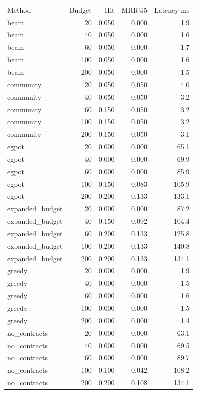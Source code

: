 \begin{tabular}{lrrrr}
Method & Budget & Hit & MRR@5 & Latency ms \\
beam & 20 & 0.050 & 0.000 & 1.9 \\
beam & 40 & 0.050 & 0.000 & 1.6 \\
beam & 60 & 0.050 & 0.000 & 1.7 \\
beam & 100 & 0.050 & 0.000 & 1.6 \\
beam & 200 & 0.050 & 0.000 & 1.5 \\
community & 20 & 0.050 & 0.050 & 4.0 \\
community & 40 & 0.050 & 0.050 & 3.2 \\
community & 60 & 0.150 & 0.050 & 3.2 \\
community & 100 & 0.150 & 0.050 & 3.2 \\
community & 200 & 0.150 & 0.050 & 3.1 \\
egpot & 20 & 0.000 & 0.000 & 65.1 \\
egpot & 40 & 0.000 & 0.000 & 69.9 \\
egpot & 60 & 0.000 & 0.000 & 85.9 \\
egpot & 100 & 0.150 & 0.083 & 105.9 \\
egpot & 200 & 0.200 & 0.133 & 133.1 \\
expanded\_budget & 20 & 0.000 & 0.000 & 87.2 \\
expanded\_budget & 40 & 0.150 & 0.092 & 104.4 \\
expanded\_budget & 60 & 0.200 & 0.133 & 125.8 \\
expanded\_budget & 100 & 0.200 & 0.133 & 140.8 \\
expanded\_budget & 200 & 0.200 & 0.133 & 134.1 \\
greedy & 20 & 0.000 & 0.000 & 1.9 \\
greedy & 40 & 0.000 & 0.000 & 1.5 \\
greedy & 60 & 0.000 & 0.000 & 1.6 \\
greedy & 100 & 0.000 & 0.000 & 1.5 \\
greedy & 200 & 0.000 & 0.000 & 1.4 \\
no\_contracts & 20 & 0.000 & 0.000 & 63.1 \\
no\_contracts & 40 & 0.000 & 0.000 & 69.5 \\
no\_contracts & 60 & 0.000 & 0.000 & 89.7 \\
no\_contracts & 100 & 0.100 & 0.042 & 108.2 \\
no\_contracts & 200 & 0.200 & 0.108 & 134.1 \\

\end{tabular}
